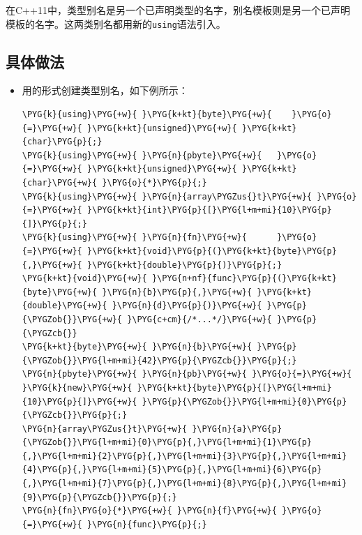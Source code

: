 
在C++11中，类型别名是另一个已声明类型的名字，别名模板则是另一个已声明模板的名字。这两类别名都用新的\texttt{using}语法引入。



\subsection{具体做法}



\begin{itemize}
\item 用的形式创建类型别名，如下例所示：



\begin{codeblockbg}
\begin{Verbatim}[commandchars=\\\{\},breaklines=true,breakanywhere=true,fontsize=\codefont,xleftmargin=17bp]
\PYG{k}{using}\PYG{+w}{ }\PYG{k+kt}{byte}\PYG{+w}{    }\PYG{o}{=}\PYG{+w}{ }\PYG{k+kt}{unsigned}\PYG{+w}{ }\PYG{k+kt}{char}\PYG{p}{;}
\PYG{k}{using}\PYG{+w}{ }\PYG{n}{pbyte}\PYG{+w}{   }\PYG{o}{=}\PYG{+w}{ }\PYG{k+kt}{unsigned}\PYG{+w}{ }\PYG{k+kt}{char}\PYG{+w}{ }\PYG{o}{*}\PYG{p}{;}
\PYG{k}{using}\PYG{+w}{ }\PYG{n}{array\PYGZus{}t}\PYG{+w}{ }\PYG{o}{=}\PYG{+w}{ }\PYG{k+kt}{int}\PYG{p}{[}\PYG{l+m+mi}{10}\PYG{p}{]}\PYG{p}{;}
\PYG{k}{using}\PYG{+w}{ }\PYG{n}{fn}\PYG{+w}{      }\PYG{o}{=}\PYG{+w}{ }\PYG{k+kt}{void}\PYG{p}{(}\PYG{k+kt}{byte}\PYG{p}{,}\PYG{+w}{ }\PYG{k+kt}{double}\PYG{p}{)}\PYG{p}{;}
\PYG{k+kt}{void}\PYG{+w}{ }\PYG{n+nf}{func}\PYG{p}{(}\PYG{k+kt}{byte}\PYG{+w}{ }\PYG{n}{b}\PYG{p}{,}\PYG{+w}{ }\PYG{k+kt}{double}\PYG{+w}{ }\PYG{n}{d}\PYG{p}{)}\PYG{+w}{ }\PYG{p}{\PYGZob{}}\PYG{+w}{ }\PYG{c+cm}{/*...*/}\PYG{+w}{ }\PYG{p}{\PYGZcb{}}
\PYG{k+kt}{byte}\PYG{+w}{ }\PYG{n}{b}\PYG{+w}{ }\PYG{p}{\PYGZob{}}\PYG{l+m+mi}{42}\PYG{p}{\PYGZcb{}}\PYG{p}{;}
\PYG{n}{pbyte}\PYG{+w}{ }\PYG{n}{pb}\PYG{+w}{ }\PYG{o}{=}\PYG{+w}{ }\PYG{k}{new}\PYG{+w}{ }\PYG{k+kt}{byte}\PYG{p}{[}\PYG{l+m+mi}{10}\PYG{p}{]}\PYG{+w}{ }\PYG{p}{\PYGZob{}}\PYG{l+m+mi}{0}\PYG{p}{\PYGZcb{}}\PYG{p}{;}
\PYG{n}{array\PYGZus{}t}\PYG{+w}{ }\PYG{n}{a}\PYG{p}{\PYGZob{}}\PYG{l+m+mi}{0}\PYG{p}{,}\PYG{l+m+mi}{1}\PYG{p}{,}\PYG{l+m+mi}{2}\PYG{p}{,}\PYG{l+m+mi}{3}\PYG{p}{,}\PYG{l+m+mi}{4}\PYG{p}{,}\PYG{l+m+mi}{5}\PYG{p}{,}\PYG{l+m+mi}{6}\PYG{p}{,}\PYG{l+m+mi}{7}\PYG{p}{,}\PYG{l+m+mi}{8}\PYG{p}{,}\PYG{l+m+mi}{9}\PYG{p}{\PYGZcb{}}\PYG{p}{;}
\PYG{n}{fn}\PYG{o}{*}\PYG{+w}{ }\PYG{n}{f}\PYG{+w}{ }\PYG{o}{=}\PYG{+w}{ }\PYG{n}{func}\PYG{p}{;}
\end{Verbatim}
\end{codeblockbg}



\end{itemize}
